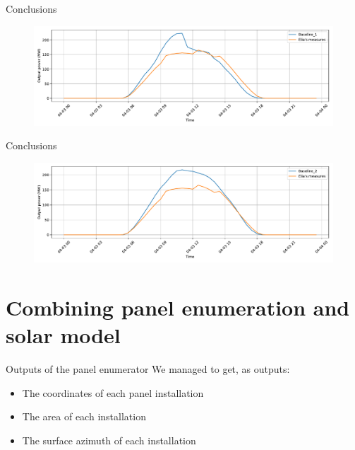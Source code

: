 \documentclass[12pt]{beamer}
\begin{document}
\begin{frame}{Conclusions}
    \begin{figure}
    \centering
    \includegraphics[width=\textwidth]{resources/pdf/baseline_1_27-03-2020.pdf}
    \label{fig:base_1_elia_3_april}
    \end{figure}
\end{frame}

\begin{frame}{Conclusions}
    \begin{figure}
    \centering
    \includegraphics[width=\textwidth]{resources/pdf/baseline_2_27-03-2020.pdf}
    \label{fig:base_2_elia_3_april}
    \end{figure}
\end{frame}

\section{Combining panel enumeration and solar model}
\begin{frame}{Outputs of the panel enumerator}
    We managed to get, as outputs:
    \begin{itemize}
        \item The \alert{coordinates} of each panel installation
        \item The \alert{area} of each installation
        \item The \alert{surface azimuth} of each installation
    \end{itemize}
\end{frame}
\end{document}
